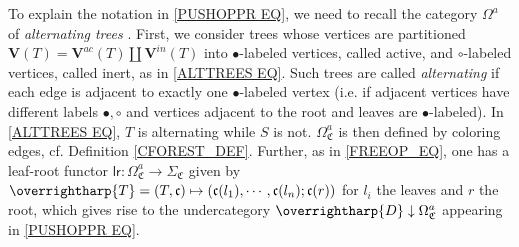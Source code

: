 \documentclass[a4paper,10pt
,draft
]{article}%
\numberwithin{equation}{section}
\numberwithin{figure}{section}
\theoremstyle{definition} %
\newcommand{\vect}[1]{\text{\overrightharp{\ensuremath{#1}}}}
\newcommand{\1}{\ensuremath{\mathbbm 1}}%
\begin{document}
To explain the notation in \eqref{PUSHOPPR EQ},
we need to recall the category
$\Omega^a$ of \emph{alternating trees} 
\cite[Def. 5.52]{BP_geo}.
First, we consider trees whose vertices are partitioned 
$\boldsymbol{V}(T) = 
\boldsymbol{V}^{ac}(T) \amalg \boldsymbol{V}^{in}(T)$
into $\bullet$-labeled vertices, called active,
and $\circ$-labeled vertices, called inert,
as in \eqref{ALTTREES EQ}.
Such trees are called \emph{alternating} if each edge is adjacent to exactly one $\bullet$-labeled vertex
(i.e. if adjacent vertices have different labels $\bullet,\circ$ and vertices adjacent to the root and leaves are $\bullet$-labeled).
In \eqref{ALTTREES EQ}, $T$ is alternating while $S$ is not.
$\Omega^a_{\mathfrak{C}}$
is then defined by coloring edges, 
cf. Definition \ref{CFOREST_DEF}.
Further, as in \eqref{FREEOP_EQ},
one has a leaf-root functor
$\mathsf{lr} \colon 
\Omega^a_{\mathfrak{C}} \to \Sigma_{\mathfrak{C}}$
given by 
$\vect{T} = (T,\mathfrak{c})
\mapsto
(\mathfrak{c}(l_1),\cdots,\mathfrak{c}(l_n);
\mathfrak{c}(r))$
for $l_i$ the leaves and $r$ the root,
which gives rise to the undercategory
$\vect{D} \downarrow \Omega^a_{\mathfrak{C}}$
appearing in \eqref{PUSHOPPR EQ}.
\end{document}
